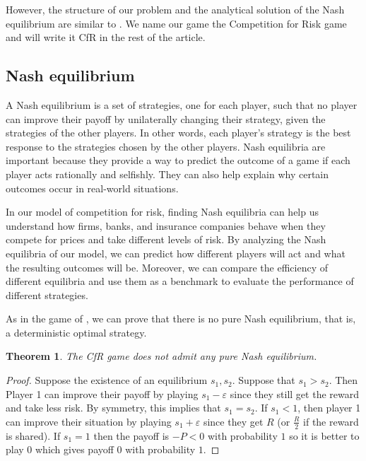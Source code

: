 \documentclass[preprint,12pt,authoryear]{elsarticle}
\newtheorem{theorem}{Theorem}[section]
\theoremstyle{definition}
\begin{document}
However, the structure of our problem and the analytical solution of the Nash equilibrium are similar to \cite{Lotker2008-tx}. We name our game the Competition for Risk game and will write it CfR in the rest of the article.

\subsection{Nash equilibrium}

A Nash equilibrium is a set of strategies, one for each player, such that no player can improve their payoff by unilaterally changing their strategy, given the strategies of the other players. In other words, each player's strategy is the best response to the strategies chosen by the other players. Nash equilibria are important because they provide a way to predict the outcome of a game if each player acts rationally and selfishly. They can also help explain why certain outcomes occur in real-world situations.

In our model of competition for risk, finding Nash equilibria can help us understand how firms, banks, and insurance companies behave when they compete for prices and take different levels of risk. By analyzing the Nash equilibria of our model, we can predict how different players will act and what the resulting outcomes will be. Moreover, we can compare the efficiency of different equilibria and use them as a benchmark to evaluate the performance of different strategies.

As in the game of \cite{Lotker2008-tx}, we can prove that there is no pure Nash equilibrium, that is, a deterministic optimal strategy.

\begin{theorem}
The CfR game does not admit any pure Nash equilibrium.
\end{theorem}
\begin{proof}
Suppose the existence of an equilibrium $s_1, s_2$. Suppose that $s_1 > s_2$. Then Player 1 can improve their payoff by playing $s_1 - \varepsilon$ since they still get the reward and take less risk. By symmetry, this implies that $s_1 = s_2$. If $s_1 < 1$, then player 1 can improve their situation by playing $s_1 + \varepsilon$ since they get $R$ (or $\frac{R}{2}$ if the reward is shared). If $s_1 = 1$ then the payoff is $-P < 0$ with probability $1$ so it is better to play $0$ which gives payoff $0$ with probability $1$.
\end{proof}
\end{document}
